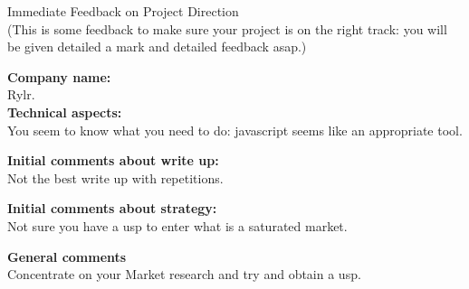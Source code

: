 \documentclass{article}
\begin{document}
\begin{center}
\Huge{Immediate Feedback on Project Direction}\\
\tiny{(This is some feedback to make sure your project is on the right track: you will be given detailed a mark and detailed feedback asap.)}
\end{center}


\normalsize
\textbf{Company name:}\\

Rylr. \\

\textbf{Technical aspects:}\\

You seem to know what you need to do: javascript seems like an appropriate tool.


\textbf{Initial comments about write up:}\\

Not the best write up with repetitions.

\textbf{Initial comments about strategy:}\\

Not sure you have a usp to enter what is a saturated market.

\textbf{General comments}\\

Concentrate on your Market research and try and obtain a usp.
\end{document}
